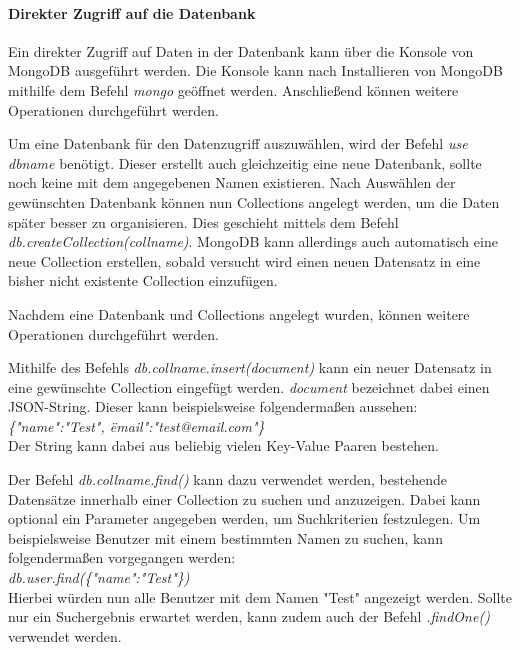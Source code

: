 \paragraph{Direkter Zugriff auf die Datenbank}
Ein direkter Zugriff auf Daten in der Datenbank kann über die Konsole von MongoDB ausgeführt werden. Die Konsole kann nach Installieren von MongoDB mithilfe dem Befehl \textit{mongo} geöffnet werden. Anschließend können weitere Operationen durchgeführt werden.

Um eine Datenbank für den Datenzugriff auszuwählen, wird der Befehl \textit{use dbname} benötigt. Dieser erstellt auch gleichzeitig eine neue Datenbank, sollte noch keine mit dem angegebenen Namen existieren. Nach Auswählen der gewünschten Datenbank können nun Collections angelegt werden, um die Daten später besser zu organisieren. Dies geschieht mittels dem Befehl \textit{db.createCollection(collname)}. MongoDB kann allerdings auch automatisch eine neue Collection erstellen, sobald versucht wird einen neuen Datensatz in eine bisher nicht existente Collection einzufügen.

Nachdem eine Datenbank und Collections angelegt wurden, können weitere Operationen durchgeführt werden.

Mithilfe des Befehls \textit{db.collname.insert(document)} kann ein neuer Datensatz in eine gewünschte Collection eingefügt werden. \textit{document} bezeichnet dabei einen JSON-String. Dieser kann beispielsweise folgendermaßen aussehen:\\
\textit{\{"name":"Test", \"email":"test@email.com"\}}\\
Der String kann dabei aus beliebig vielen Key-Value Paaren bestehen.

Der Befehl \textit{db.collname.find()} kann dazu verwendet werden, bestehende Datensätze innerhalb einer Collection zu suchen und anzuzeigen. Dabei kann optional ein Parameter angegeben werden, um  Suchkriterien festzulegen. Um beispielsweise Benutzer mit einem bestimmten Namen zu suchen, kann folgendermaßen vorgegangen werden:\\
\textit{db.user.find(\{"name":"Test"\})}\\
Hierbei würden nun alle Benutzer mit dem Namen "Test" angezeigt werden. Sollte nur ein Suchergebnis erwartet werden, kann zudem auch der Befehl \textit{.findOne()} verwendet werden.


